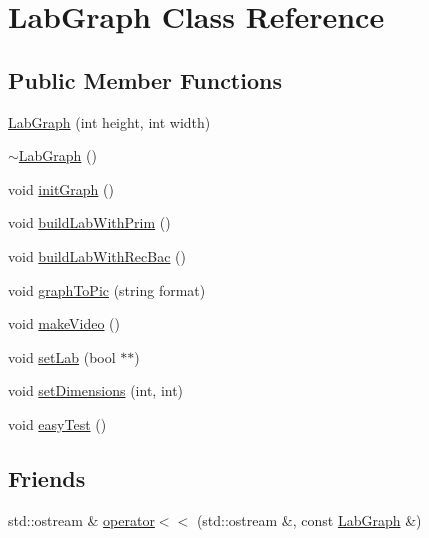 \hypertarget{class_lab_graph}{\section{Lab\-Graph Class Reference}
\label{class_lab_graph}
}
\subsection*{Public Member Functions}
\begin{DoxyCompactItemize}
\item 
\hyperlink{class_lab_graph_aa10dea2f824ce99b6175952650ea7349}{Lab\-Graph} (int height, int width)
\item 
\hyperlink{class_lab_graph_ac37389ef1300ceb90c81fc482971471f}{$\sim$\-Lab\-Graph} ()
\item 
void \hyperlink{class_lab_graph_ab54dc4e91349cfeca4e501ab7bd340af}{init\-Graph} ()
\item 
void \hyperlink{class_lab_graph_ab9767076b66b28dae3c47b9c3177b498}{build\-Lab\-With\-Prim} ()
\item 
void \hyperlink{class_lab_graph_a04d781d9fe079eef7374babe6318c498}{build\-Lab\-With\-Rec\-Bac} ()
\item 
void \hyperlink{class_lab_graph_a478f4acb3c4da8d81b079d26d83c9f42}{graph\-To\-Pic} (string format)
\item 
void \hyperlink{class_lab_graph_afca83817aa9ca4996f49fbd2dd2618f5}{make\-Video} ()
\item 
void \hyperlink{class_lab_graph_a1b88384d6363809ae16384205ecff4e2}{set\-Lab} (bool $\ast$$\ast$)
\item 
void \hyperlink{class_lab_graph_a44653d0495a05c3ba03e661d342b15e7}{set\-Dimensions} (int, int)
\item 
void \hyperlink{class_lab_graph_a5a9e4661d1b03a3de1e7b669ba9aa8e5}{easy\-Test} ()
\end{DoxyCompactItemize}
\subsection*{Friends}
\begin{DoxyCompactItemize}
\item 
std\-::ostream \& \hyperlink{class_lab_graph_a98ed4ce18d06e538a4ef79d43997a19f}{operator$<$$<$} (std\-::ostream \&, const \hyperlink{class_lab_graph}{Lab\-Graph} \&)
\end{DoxyCompactItemize}


